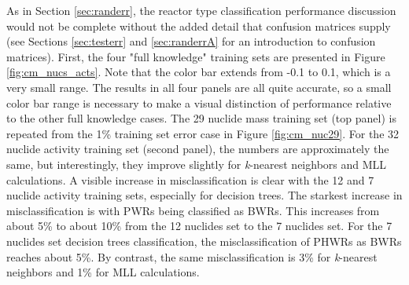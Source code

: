 As in Section \ref{sec:randerr}, the reactor type classification performance
discussion would not be complete without the added detail that confusion
matrices supply (see Sections \ref{sec:testerr} and \ref{sec:randerrA} for an
introduction to confusion matrices).  First, the four "full knowledge" training
sets are presented in Figure \ref{fig:cm_nucs_acts}.  Note that the color bar
extends from -0.1 to 0.1, which is a very small range.  The results in all four
panels are all quite accurate, so a small color bar range is necessary to make
a visual distinction of performance relative to the other full knowledge cases.
The 29 nuclide mass training set (top panel) is repeated from the 1\% training
set error case in Figure \ref{fig:cm_nuc29}.  For the 32 nuclide activity
training set (second panel), the numbers are approximately the same, but
interestingly, they improve slightly for \textit{k}-nearest neighbors and
\gls{MLL} calculations.  A visible increase in misclassification is clear with
the 12 and 7 nuclide activity training sets, especially for decision trees. The
starkest increase in misclassification is with \gls{PWR}s being classified as
\gls{BWR}s. This increases from about 5\% to about 10\% from the 12 nuclides
set to the 7 nuclides set. For the 7 nuclides set decision trees
classification, the misclassification of \gls{PHWR}s as \gls{BWR}s reaches
about 5\%. By contrast, the same misclassification is 3\% for
\textit{k}-nearest neighbors and 1\% for \gls{MLL} calculations. 

